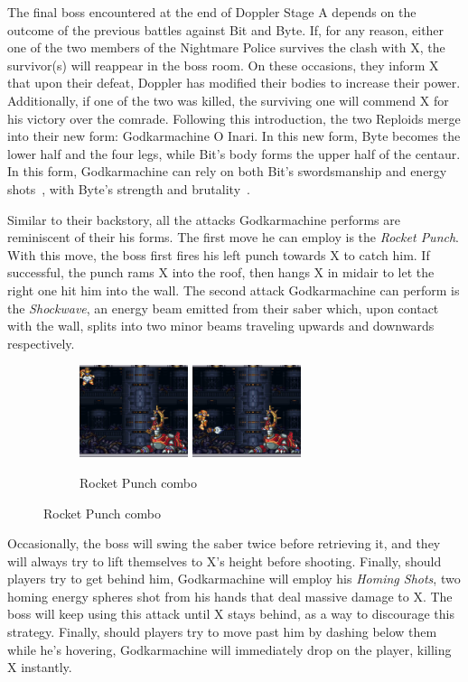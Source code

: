 The final boss encountered at the end of Doppler Stage A depends on the outcome of the previous battles against Bit and Byte. If, for any reason, either one of the two members of the Nightmare Police survives the clash with X, the survivor(s) will reappear in the boss room. On these occasions, they inform X that upon their defeat, Doppler has modified their bodies to increase their power. Additionally, if one of the two was killed, the surviving one will commend X for his victory over the	 comrade. Following this introduction, the two Reploids merge into their new form: Godkarmachine O Inari. In this new form, Byte becomes the lower half and the four legs, while Bit's body forms the upper half of the centaur. In this form, Godkarmachine can rely on both Bit's swordsmanship and energy shots~\cite{wayback:X3_resources}, with Byte's strength and brutality~\cite{wiki:Godkarmachine}.

Similar to their backstory, all the attacks Godkarmachine performs are reminiscent of their his forms. The first move he can employ is the \emph{Rocket Punch}. With this move, the boss first fires his left punch towards X to catch him. If successful, the punch rams X into the roof, then hangs X in midair to let the right one hit him into the wall. The second attack Godkarmachine can perform is the \emph{Shockwave}, an energy beam emitted from their saber which, upon contact with the wall, splits into two minor beams traveling upwards and downwards respectively.\begin{figure}[htp]
	\centering
	\begin{subfigure}{\linewidth}
		\centering
		\includegraphics[height=2.7cm]{figures/X3/Doppler_stages/gkarma_punch_1.jpg}
		\includegraphics[height=2.7cm]{figures/X3/Doppler_stages/gkarma_punch_2.jpg}
		\caption{Rocket Punch combo}
	\end{subfigure}
\end{figure} Occasionally, the boss will swing the saber twice before retrieving it, and they will always try to lift themselves to X's height before shooting. Finally, should players try to get behind him, Godkarmachine will employ his \emph{Homing Shots}, two homing energy spheres shot from his hands that deal massive damage to X. The boss will keep using this attack until X stays behind, as a way to discourage this strategy. Finally, should players try to move past him by dashing below them while he's hovering, Godkarmachine will immediately drop on the player, killing X instantly.

